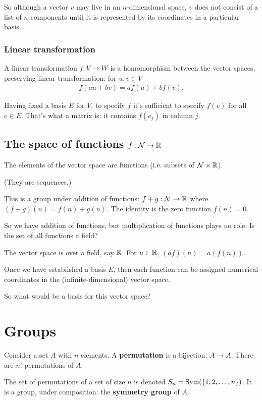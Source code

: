 So although a vector $v$ may live in an $n$-dimensional space, $v$ does not
consist of a list of $n$ components until it is represented by its coordinates
in a particular basis.


\subsubsection{Linear transformation}
A linear transformation $f: V \to W$ is a homomorphism between the vector
spaces, preserving linear transformation: for $u, v \in V$
\begin{align*}
  f(au + bv) = af(u) + bf(v).
\end{align*}

Having fixed a basis $E$ for $V$, to specify $f$ it's sufficient to specify
$f(e)$ for all $e \in E$. That's what a matrix is: it contains $f(e_j)$ in
column $j$.


\subsection{The space of functions $f:\mathcal{N} \to \mathbb{R}$}

The elements of the vector space are functions (i.e. subsets of $\mathcal{N} \times \mathbb{R}$).

(They are sequences.)

This is a group under addition of functions: $f + g: \mathcal{N} \to \mathbb{R}$ where
$(f + g)(n) = f(n) + g(n)$. The identity is the zero function $f(n) = 0$.

So we have addition of functions, but multiplication of functions plays no
role. Is the set of all functions a field?


The vector space is over a field, say $\mathbb{R}$. For $a \in \mathbb{R}$, $(af)(n) = a(f(n))$.

Once we have established a basis $E$, then each function can be assigned
numerical coordinates in the (infinite-dimensional) vector space.

So what would be a basis for this vector space?




\newpage
\section{Groups}

Consider a set $A$ with $n$ elements. A \textbf{permutation} is a bijection:
$A \to A$. There are $n!$ permutations of $A$.

The set of permutations of a set of size $n$ is denoted
$S_n = \text{Sym}(\{1,2,\ldots,n\})$. It is a group, under composition: the
\textbf{symmetry group} of $A$.

